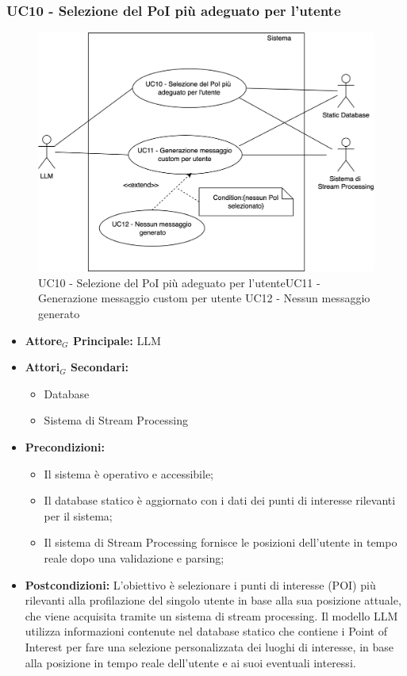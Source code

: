 \documentclass[11pt]{article}
\begin{document}
\begin{justify}
\subsubsection{\textbf{UC10 - Selezione del PoI più adeguato per l'utente}}
\begin{figure}[H]
    \centering
    \includegraphics[width=0.7\linewidth]{UC101112image.png}
    \caption{UC10 - Selezione del PoI più adeguato per l'utente\newline UC11 - Generazione messaggio custom per utente \newline UC12 - Nessun messaggio generato}
    \label{fig:UC101112}
\end{figure}
\label{UC10}
\begin{itemize}
    \item \textbf{Attore$_G$ Principale:} LLM
    \item \textbf{Attori$_G$ Secondari:} 
    \begin{itemize}
        \item Database
        \item Sistema di Stream Processing
    \end{itemize}
    \item \textbf{Precondizioni:} 
        \begin{itemize}
          \item Il sistema è operativo e accessibile;
            \item Il database statico è aggiornato con i dati dei punti di interesse rilevanti per il sistema;
            \item Il sistema di Stream Processing fornisce le posizioni dell'utente in tempo reale dopo una validazione e parsing;
        \end{itemize}
      \item \textbf{Postcondizioni:} L'obiettivo è selezionare i punti di interesse (POI) più rilevanti alla profilazione del singolo utente in base alla sua posizione attuale, che viene acquisita tramite un sistema di stream processing. Il modello LLM utilizza informazioni contenute nel database statico che contiene i Point of Interest per fare una selezione personalizzata dei luoghi di interesse, in base alla posizione in tempo reale dell'utente e ai suoi eventuali interessi.\\

\end{itemize}
\end{justify}
\end{document}

